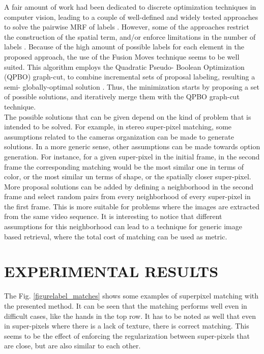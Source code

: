 \documentclass[a4paper, 10pt, conference]{ieeeconf}      %
\begin{document}
A fair amount of work had been dedicated to
discrete optimization techniques in computer vision,
leading to a couple of well-defined and widely tested
approaches to solve the pairwise MRF of labels \cite{c3}\cite{c4}.
However, some of the approaches restrict the
construction of the spatial term, and/or enforce
limitations in the number of labels \cite{c3}.
Because of the high amount of possible labels for 
each element in the proposed approach, the use of the
Fusion Moves \cite{c7} technique seems to be well suited.
This algorithm employs the Quadratic Pseudo-
Boolean Optimization (QPBO) graph-cut, to combine
incremental sets of proposal labeling, resulting a semi-
globally-optimal solution \cite{c4}.
Thus, the minimization starts by proposing a set of
possible solutions, and iteratively merge them with
the QPBO graph-cut technique. \\
The possible solutions that can be given depend on the kind of
problem that is intended to be solved. For example, in
stereo super-pixel matching, some assumptions
related to the cameras organization can be made to
generate solutions.
In a more generic sense, other assumptions can be
made towards option generation. For instance, for a
given super-pixel in the initial frame, in the second
frame the corresponding matching would be the most
similar one in terms of color, or the most similar un
terms of shape, or the spatially closer super-pixel.
More proposal solutions can be added by defining a
neighborhood in the second frame and select random
pairs from every neighborhood of every super-pixel
in the first frame. This is more suitable for problems
where the images are extracted from the same video
sequence. It is interesting to notice that different
assumptions for this neighborhood can lead to a
technique for generic image based retrieval, where
the total cost of matching can be used as metric.

\section{EXPERIMENTAL RESULTS}
The Fig. \ref{figurelabel_matches} shows some examples of superpixel
matching with the presented method. It can be seen
that the matching performs well even in difficult
cases, like the hands in the top row. It has to be noted
as well that even in super-pixels where there is a lack
of texture, there is correct matching. This seems to be
the effect of enforcing the regularization between
super-pixels that are close, but are also similar to
each other.
\end{document}
